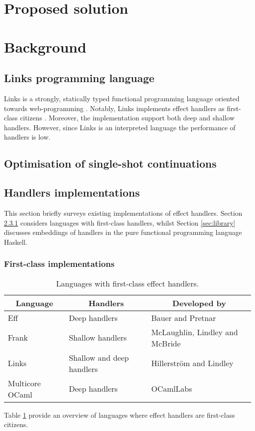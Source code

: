 \documentclass[preprint,10pt,numbers]{sigplanconf}
\begin{document}
  \section{Proposed solution}

  \section{Background}
  \subsection{Links programming language}
  Links is a strongly, statically typed functional programming language oriented towards web-programming \cite{Cooper2006}. Notably, Links implements effect handlers as first-class citizens \cite{Hillerstrom2015}. Moreover, the implementation support both deep and shallow handlers. However, since Links is an interpreted language the performance of handlers is low.

  \subsection{Optimisation of single-shot continuations}

  \subsection{Handlers implementations}
  This section briefly surveys existing implementations of effect handlers. Section \ref{sec:first-class} considers languages with first-class handlers, whilst Section \ref{sec:library} discusses embeddings of handlers in the pure functional programming language Haskell.
  \subsubsection{First-class implementations}\label{sec:first-class}
  \begin{table}[H]
    \centering 
    \begin{tabular}{| l | l | l |}
      \hline
      \multicolumn{1}{|c|}{Language} & \multicolumn{1}{c|}{Handlers} & \multicolumn{1}{c|}{Developed by} \\
      \hline
      Eff & Deep handlers & Bauer and Pretnar \\ 
      \hline
      Frank & Shallow handlers & McLaughlin, Lindley and McBride \\    
      \hline
      Links & Shallow and deep handlers & Hillerström and Lindley\\
      \hline
      Multicore OCaml & Deep handlers & OCamlLabs \\
      \hline    
    \end{tabular}\caption{Languages with first-class effect handlers.}\label{tbl:impls}
  \end{table}
  Table \ref{tbl:impls} provide an overview of languages where effect handlers are first-class citizens. 
\end{document}
